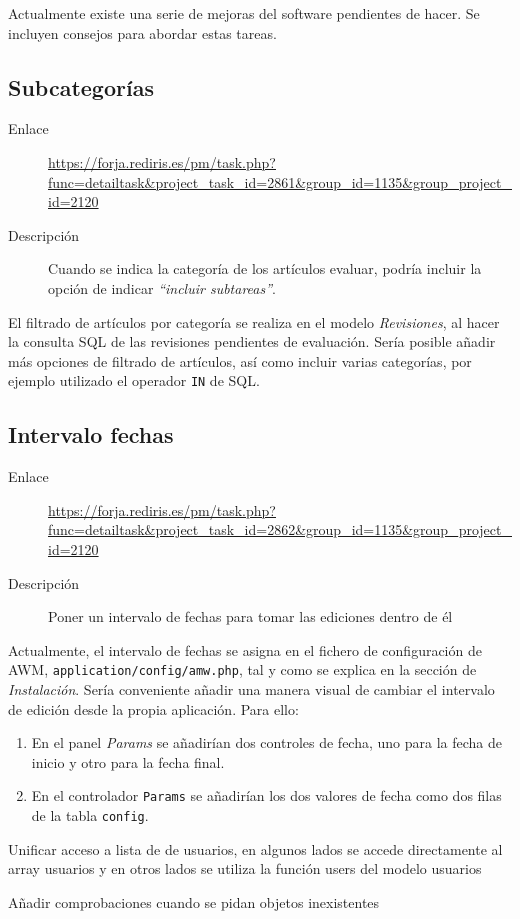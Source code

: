 \documentclass[11pt]{article}
\begin{document}
Actualmente existe una serie de mejoras del software pendientes de hacer. Se
incluyen consejos para abordar estas tareas.

\subsection{Subcategorías}

\begin{description}
\item[Enlace] \url{https://forja.rediris.es/pm/task.php?func=detailtask&project_task_id=2861&group_id=1135&group_project_id=2120}
\item[Descripción] Cuando se indica la categoría de los artículos evaluar,
  podría incluir la opción de indicar \textit{``incluir subtareas''}.
\end{description}

El filtrado de artículos por categoría se realiza en el modelo
\textit{Revisiones}, al hacer la consulta SQL de las revisiones pendientes de
evaluación. Sería posible añadir más opciones de filtrado de artículos, así como
incluir varias categorías, por ejemplo utilizado el operador \texttt{IN} de SQL.


\subsection{Intervalo fechas}

\begin{description}
\item[Enlace] \url{https://forja.rediris.es/pm/task.php?func=detailtask&project_task_id=2862&group_id=1135&group_project_id=2120}
\item[Descripción] Poner un intervalo de fechas para tomar las ediciones dentro de él
\end{description}

Actualmente, el intervalo de fechas se asigna en el fichero de configuración de
AWM, \texttt{application/config/amw.php}, tal y como se explica en la sección de
\textit{Instalación}. Sería conveniente añadir una manera visual de cambiar el
intervalo de edición desde la propia aplicación. Para ello:

\begin{enumerate}
\item En el panel \textit{Params} se añadirían dos controles de fecha, uno para
  la fecha de inicio y otro para la fecha final.
\item En el controlador \texttt{Params} se añadirían los dos valores de fecha
  como dos filas de la tabla \texttt{config}. 
\end{enumerate}



Unificar acceso a lista de de usuarios, en algunos lados se accede directamente
al array usuarios y en otros lados se utiliza la función users del modelo usuarios

Añadir comprobaciones cuando se pidan objetos inexistentes
\end{document}
